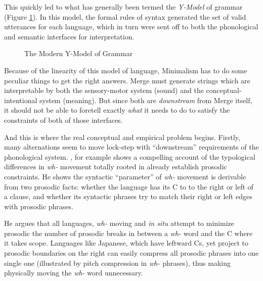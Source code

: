 \documentclass{article}
\begin{document}
This quickly led to what has generally been termed the \textit{Y-Model} of grammar (Figure \ref{min}). In this model, the formal rules of syntax generated the set of valid utterances for each language, which in turn were sent off to both the phonological and semantic interfaces for interpretation.

\begin{figure}
\centering
{}
\caption{The Modern Y-Model of Grammar\label{min}}
\end{figure}


Because of the linearity of this model of language, Minimalism has to do some peculiar things to get the right answers. Merge must generate strings which are interpretable by both the sensory-motor system (sound) and the conceptual-intentional system (meaning). But since both are \emph{downstream} from Merge itself, it should not be able to foretell exactly \emph{what} it needs to do to satisfy the constraints of both of those interfaces.

And this is where the real conceptual and empirical problem begins. Firstly, many alternations seem to move lock-step with ``downstream'' requirements of the phonological system. \citet{richards10}, for example shows a compelling account of the typological differences in \textit{wh-} movement totally rooted in already establish prosodic constraints. He shows the syntactic ``parameter'' of \textit{wh-} movement is derivable from two prosodic facts: whether the language has its C to to the right or left of a clause, and whether its syntactic phrases try to match their right or left edges with prosodic phrases.

He argues that all languages, \textit{wh-} moving and \textit{in situ} attempt to minimize prosodic the number of prosodic breaks in between a \textit{wh-} word and the C where it takes scope. Languages like Japanese, which have leftward Cs, yet project to prosodic boundaries on the right can easily compress all prosodic phrases into one single one (illustrated by pitch compression in \textit{wh-} phrases), thus making physically moving the \textit{wh-} word unnecessary.
\end{document}
